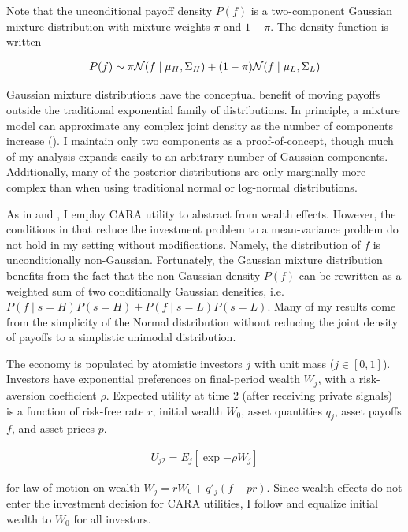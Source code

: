 \documentclass{article}
\begin{document}
Note that the unconditional payoff density $P(f)$ is a two-component Gaussian mixture distribution with mixture weights $\pi$ and $1-\pi$. The density function is written

\begin{align}
    P(f) \sim \pi \mathcal{N}(f \mid \mu_H, \Sigma_H) + (1-\pi) \mathcal{N} (f \mid \mu_L, \Sigma_L)
\end{align}

\noindent Gaussian mixture distributions have the conceptual benefit of moving payoffs outside the traditional exponential family of distributions. In principle, a mixture model can approximate any complex joint density as the number of components increase (\cite{nguyen_approximations_2019}). I maintain only two components as a proof-of-concept, though much of my analysis expands easily to an arbitrary number of Gaussian components. Additionally, many of the posterior distributions are only marginally more complex than when using traditional normal or log-normal distributions.

As in \textcite{admati_noisy_1985} and \textcite{kacperczyk_rational_2016}, I employ CARA utility to abstract from wealth effects. However, the conditions in \textcite{kacperczyk_rational_2016} that reduce the investment problem to a mean-variance problem do not hold in my setting without modifications. Namely, the distribution of $f$ is unconditionally non-Gaussian. Fortunately, the Gaussian mixture distribution benefits from the fact that the non-Gaussian density $P(f)$ can be rewritten as a weighted sum of two conditionally Gaussian densities, i.e. $P(f \mid s=H)P(s=H) + P(f \mid s=L) P(s=L)$. Many of my results come from the simplicity of the Normal distribution without reducing the joint density of payoffs to a simplistic unimodal distribution.

The economy is populated by atomistic investors $j$ with unit mass ($j \in [0, 1]$). Investors have exponential preferences on final-period wealth $W_j$, with a risk-aversion coefficient $\rho$. Expected utility at time 2 (after receiving private signals) is a function of risk-free rate $r$, initial wealth $W_0$, asset quantities $q_j$, asset payoffs $f$, and asset prices $p$.

\begin{align}
    U_{j2} = E_j[\exp{-\rho W_j}]
\end{align}

\noindent for law of motion on wealth $W_j = r W_0 + q'_j (f - pr)$. Since wealth effects do not enter the investment decision for CARA utilities, I follow  \textcite{kacperczyk_rational_2016} and equalize initial wealth to $W_0$ for all investors.
\end{document}
